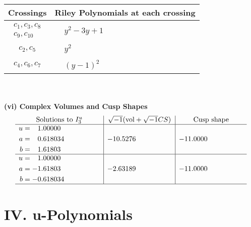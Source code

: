 \documentclass[1p]{elsarticle_modified}
\theoremstyle{definition}
\newcommand{\I}{\sqrt{-1}}
\begin{document}
\begin{tabular}{m{50pt}|m{274pt}}
Crossings & \hspace{64pt}Riley Polynomials at each crossing \\
\hline $$\begin{aligned}c_{1},c_{3},c_{8}\\c_{9},c_{10}\end{aligned}$$&$\begin{aligned}
&y^2-3 y+1
\end{aligned}$\\
\hline $$\begin{aligned}c_{2},c_{5}\end{aligned}$$&$\begin{aligned}
&y^2
\end{aligned}$\\
\hline $$\begin{aligned}c_{4},c_{6},c_{7}\end{aligned}$$&$\begin{aligned}
&(y-1)^2
\end{aligned}$\\
\hline
\end{tabular}\\~\\
\newpage\flushleft \textbf{(vi) Complex Volumes and Cusp Shapes}
$$\begin{array}{c|c|c}  
\text{Solutions to }I^u_{3}& \I (\text{vol} + \sqrt{-1}CS) & \text{Cusp shape}\\
 \hline 
\begin{aligned}
u &= \phantom{-}1.00000\phantom{ +0.000000I} \\
a &= \phantom{-}0.618034\phantom{ +0.000000I} \\
b &= \phantom{-}1.61803\phantom{ +0.000000I}\end{aligned}
 & -10.5276\phantom{ +0.000000I} & -11.0000\phantom{ +0.000000I} \\ \hline\begin{aligned}
u &= \phantom{-}1.00000\phantom{ +0.000000I} \\
a &= -1.61803\phantom{ +0.000000I} \\
b &= -0.618034\phantom{ +0.000000I}\end{aligned}
 & -2.63189\phantom{ +0.000000I} & -11.0000\phantom{ +0.000000I}\\
 \hline 
 \end{array}$$\newpage
\newpage\renewcommand{\arraystretch}{1}
\centering \section*{ IV. u-Polynomials}
\end{document}
